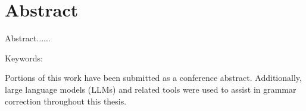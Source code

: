 \chapter{Abstract}
\label{ch:abstract}

Abstract......

Keywords: 

Portions of this work have been submitted as a conference abstract. Additionally, large language models (LLMs) and related tools were used to assist in grammar correction throughout this thesis.
